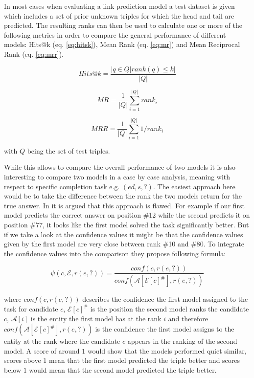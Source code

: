 In most cases when evaluating a link prediction model a test dataset is given which includes a set of prior unknown triples for which the head and tail are predicted. The resulting ranks can then be used to calculate one or more of the following metrics in order to compare the general performance of different models: Hits@k (eq. \ref{eq:hitsk}), Mean Rank (eq. \ref{eq:mr}) and Mean Reciprocal Rank (eq. \ref{eq:mrr}). 

\begin{equation}
Hits@k=\frac{|{q \in Q | rank(q) \le k}|}{|Q|}
\label{eq:hitsk}
\end{equation}

\begin{equation}
MR=\frac{1}{|Q|} \sum_{i=1}^{|Q|}{rank_i}
\label{eq:mr}
\end{equation}

\begin{equation}
MRR=\frac{1}{|Q|} \sum_{i=1}^{|Q|}{1/rank_i}
\label{eq:mrr}
\end{equation}

with $Q$ being the set of test triples. 

While this allows to compare the overall performance of two models it is also interesting to compare two models in a case by case analysis, meaning with respect to specific completion task e.g. $(ed,s,?)$. The easiest approach here would be to take the difference between the rank the two models return for the true answer. In \cite{meilicke_why_2021} it is argued that this approach is flawed. For example if our first model predicts the correct answer on position \#12 while the second predicts it on position \#77, it looks like the first model solved the task significantly better. But if we take a look at the confidence values it might be that the confidence values given by the first model are very close between rank \#10 and \#80. To integrate the confidence values into the comparison they propose following formula: 

\begin{equation}
\psi(c,\mathcal{E},r(e,?))=\frac{conf(c, r(e,?))}{conf(\mathcal{A}[\mathcal{E}[c]^\#],r(e,?))}
\label{eq:difference_psi}
\end{equation}

where $conf(c, r(e,?))$ describes the confidence the first model assigned to the task for candidate $c$, $\mathcal{E}[c]^\#$ is the position the second model ranks the candidate $c$, $\mathcal{A}[i]$ is the entity the first model has at the rank $i$ and therefore $conf(\mathcal{A}[\mathcal{E}[c]^\#],r(e,?))$ is the confidence the first model assigns to the entity at the rank where the candidate $c$ appears in the ranking of the second model. A score of around $1$ would show that the models performed quiet similar, scores above $1$ mean that the first model predicted the triple better and scores below $1$ would mean that the second model predicted the triple better. 

